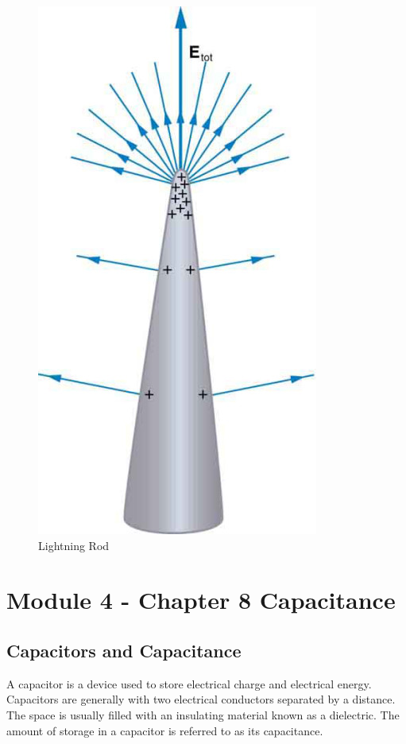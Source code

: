 \documentclass[14pt]{memoir}
\begin{document}
\begin{figure}[H]
\begin{center}
\includegraphics[scale=0.50]{fig/fig_07_4x.jpg}
\caption{Lightning Rod}
\label{fig:07_4x}
\end{center}
\end{figure}

\chapter{Module 4 - Chapter 8 Capacitance}

\section{Capacitors and Capacitance}

A capacitor is a device used to store electrical charge and electrical energy. Capacitors are generally with two electrical conductors separated by a distance. The space is usually
filled with an insulating material known as a dielectric. The amount of storage in a capacitor is referred to as its capacitance. 
\end{document}
